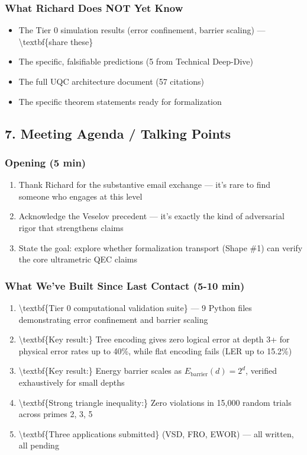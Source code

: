 \documentclass[11pt,a4paper]{article}
\begin{document}
\subsubsection{What Richard Does NOT Yet Know}


\begin{itemize}
\item The Tier 0 simulation results (error confinement, barrier scaling) ---\textbackslash{}textbf\{share these\}
\item The specific, falsifiable predictions (5 from Technical Deep-Dive)
\item The full UQC architecture document (57 citations)
\item The specific theorem statements ready for formalization
\end{itemize}


\hrulefill


\subsection{7. Meeting Agenda / Talking Points}


\subsubsection{Opening (5 min)}


\begin{enumerate}
\item Thank Richard for the substantive email exchange  --- it's rare to find someone who engages at this level
\item Acknowledge the Veselov precedent  --- it's exactly the kind of adversarial rigor that strengthens claims
\item State the goal: explore whether formalization transport (Shape \#1) can verify the core ultrametric QEC claims
\end{enumerate}


\subsubsection{What We've Built Since Last Contact (5-10 min)}


\begin{enumerate}
\item \textbackslash{}textbf\{Tier 0 computational validation suite\}  --- 9 Python files demonstrating error confinement and barrier scaling
\item \textbackslash{}textbf\{Key result:\} Tree encoding gives zero logical error at depth 3+ for physical error rates up to 40\%, while flat encoding fails (LER up to 15.2\%)
\item \textbackslash{}textbf\{Key result:\} Energy barrier scales as $E_{\text{barrier}}(d) = 2^d$, verified exhaustively for small depths
\item \textbackslash{}textbf\{Strong triangle inequality:\} Zero violations in 15,000 random trials across primes 2, 3, 5
\item \textbackslash{}textbf\{Three applications submitted\} (VSD, FRO, EWOR)  --- all written, all pending
\end{enumerate}
\end{document}
